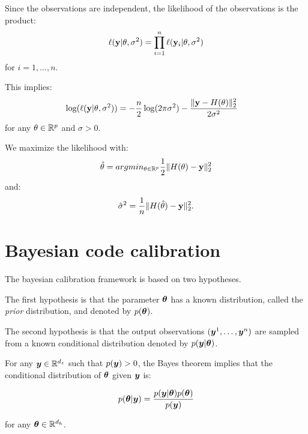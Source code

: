 \documentclass{beamer}
\begin{document}

\begin{frame}
Since the observations are independent, the likelihood of the observations is 
the product:
$$
\ell({\bf y}|{\bf \theta},\sigma^2) = 
\prod_{i=1}^n \ell({\bf y}_i|{\bf \theta},\sigma^2)
$$
for $i=1,...,n$. 

This implies:
\begin{align*}
\log(\ell({\bf y}|{\bf \theta},\sigma^2)) 
&= -\frac{n}{2} \log(2\pi \sigma^2)
-\frac{\|{\bf y}-H({\bf \theta})\|_2^2}{2 \sigma^2}
\end{align*}
for any ${\bf \theta}\in\mathbb{R}^p$ and $\sigma>0$. 

We maximize the likelihood with:
\begin{align*}
\hat{{\bf \theta}}
= arg min_{{\bf \theta}\in\mathbb{R}^p} \frac{1}{2} \| H({\bf \theta}) - {\bf y}\|_2^2
\end{align*}
and:
\begin{align*}
\hat{\sigma}^2
= \frac{1}{n} \| H(\hat{{\bf \theta}}) - {\bf y}\|_2^2.
\end{align*}

\end{frame}

\section{Bayesian code calibration}

\begin{frame}

The bayesian calibration framework is based on two hypotheses.

The first hypothesis is that the parameter $\boldsymbol{\theta}$ has a
known distribution, called the \emph{prior} distribution, and denoted by
$p(\boldsymbol{\theta})$.

The second hypothesis is that the output observations
$(\boldsymbol{y}^1, \ldots, \boldsymbol{y}^n)$ are sampled from a known
conditional distribution denoted by $p(\boldsymbol{y} | \boldsymbol{\theta})$.

For any $\boldsymbol{y}\in\mathbb{R}^{d_z}$ such that $p(\boldsymbol{y})>0$,
the Bayes theorem implies that the conditional distribution of
$\boldsymbol{\theta}$ given $\boldsymbol{y}$ is:

$$
p(\boldsymbol{\theta} | \boldsymbol{y}) = \frac{p(\boldsymbol{y} | \boldsymbol{\theta}) p(\boldsymbol{\theta})}{p(\boldsymbol{y})}
$$

for any $\boldsymbol{\theta}\in\mathbb{R}^{d_h}$.

\end{frame}
\end{document}
